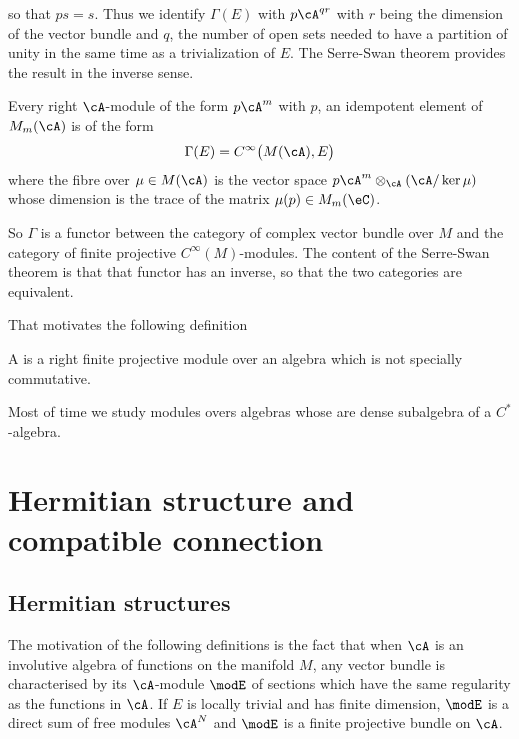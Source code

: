 so that $ps=s$. Thus we identify $\Gamma(E)$ with $p\cA^{qr}$ with $r$ being the dimension of the vector bundle and $q$, the number of open sets needed to have a partition of unity in the same time as a trivialization of $E$. The Serre-Swan theorem provides the result in the inverse sense.
\begin{theorem}
	Every right $\cA$-module of the form $p\cA^m$ with $p$, an idempotent element of $M_m(\cA)$ is of the form
	\[
		\Gamma(E)= C^{\infty}\big( M(\cA),E \big)
	\]
	where the fibre over $\mu\in M(\cA)$ is the vector space $p\cA^m\otimes_{\cA}(\cA/\ker\mu)$ whose dimension is the trace of the matrix $\mu(p)\in M_m(\eC)$.
\end{theorem}
So $\Gamma$ is a functor between the category of complex vector bundle over $M$ and the category of finite projective $C^{\infty}(M)$-modules. The content of the Serre-Swan theorem is that that functor has an inverse, so that the two categories are equivalent.

That motivates the following definition
\begin{definition}
	A  is a right finite projective module over an algebra which is not specially commutative.
\end{definition}
Most of time we study modules overs algebras whose are dense subalgebra of a $C^*$-algebra.


\section{Hermitian structure and compatible connection}

\subsection{Hermitian structures}

The motivation of the following definitions is the fact that when $\cA$ is an involutive algebra of functions on the manifold $M$, any vector bundle is characterised by its  $\cA$-module $\modE$ of sections which have the same regularity as the functions in $\cA$. If $E$ is locally trivial and has finite dimension, $\modE$ is a direct sum of free modules $\cA^N$ and $\modE$ is a finite projective bundle on $\cA$.

